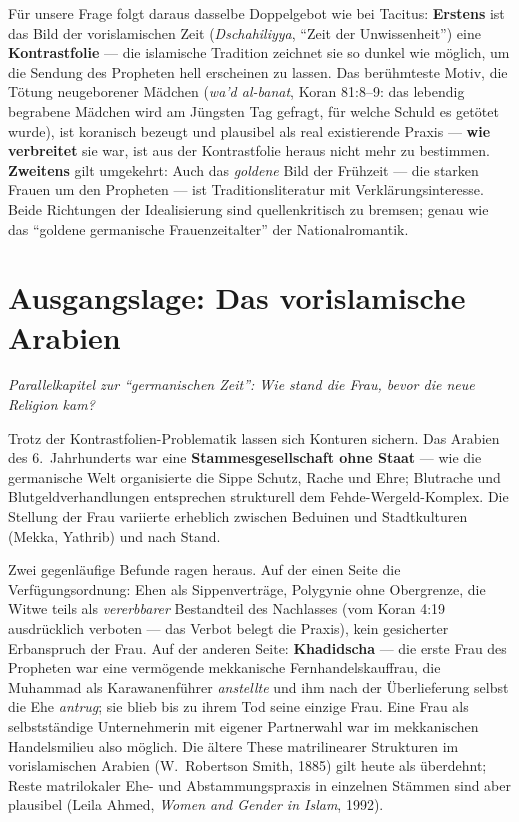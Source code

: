 \documentclass[11pt,a4paper,ngerman]{scrartcl}
\newcommand{\chipbase}[2]{\hspace{0pt}{\footnotesize\textcolor{#1}{[\textsc{#2}]}}}
\newcommand{\chipbelegt}[1]{\chipbase{chipgreen}{#1}}
\newcommand{\chipplausibel}[1]{\chipbase{chipamber}{#1}}
\newcommand{\chipumstritten}[1]{\chipbase{chipred}{#1}}
\begin{document}
Für unsere Frage folgt daraus dasselbe Doppelgebot wie bei Tacitus: \textbf{Erstens} ist das Bild der vorislamischen Zeit (\emph{Dschahiliyya}, \enquote{Zeit der Unwissenheit}) eine \textbf{Kontrastfolie} --- die islamische Tradition zeichnet sie so dunkel wie möglich, um die Sendung des Propheten hell erscheinen zu lassen. Das berühmteste Motiv, die Tötung neugeborener Mädchen (\emph{wa'd al-banat}, Koran 81:8--9: das lebendig begrabene Mädchen wird am Jüngsten Tag gefragt, für welche Schuld es getötet wurde), ist koranisch bezeugt und plausibel als real existierende Praxis --- \textbf{wie verbreitet} sie war, ist aus der Kontrastfolie heraus nicht mehr zu bestimmen. \chipplausibel{plausibel} \textbf{Zweitens} gilt umgekehrt: Auch das \emph{goldene} Bild der Frühzeit --- die starken Frauen um den Propheten --- ist Traditionsliteratur mit Verklärungsinteresse. Beide Richtungen der Idealisierung sind quellenkritisch zu bremsen; genau wie das \enquote{goldene germanische Frauenzeitalter} der Nationalromantik.

\section{Ausgangslage: Das vorislamische Arabien}
\noindent\textit{Parallelkapitel zur \enquote{germanischen Zeit}: Wie stand die Frau, bevor die neue Religion kam?}
\medskip

Trotz der Kontrastfolien-Problematik lassen sich Konturen sichern. Das Arabien des 6.~Jahrhunderts war eine \textbf{Stammesgesellschaft ohne Staat} --- wie die germanische Welt organisierte die Sippe Schutz, Rache und Ehre; Blutrache und Blutgeldverhandlungen entsprechen strukturell dem Fehde-Wergeld-Komplex. Die Stellung der Frau variierte erheblich zwischen Beduinen und Stadtkulturen (Mekka, Yathrib) und nach Stand. \chipbelegt{belegt}

Zwei gegenläufige Befunde ragen heraus. Auf der einen Seite die Verfügungsordnung: Ehen als Sippenverträge, Polygynie ohne Obergrenze, die Witwe teils als \emph{vererbbarer} Bestandteil des Nachlasses (vom Koran 4:19 ausdrücklich verboten --- das Verbot belegt die Praxis), kein gesicherter Erbanspruch der Frau. Auf der anderen Seite: \textbf{Khadidscha} --- die erste Frau des Propheten war eine vermögende mekkanische Fernhandelskauffrau, die Muhammad als Karawanenführer \emph{anstellte} und ihm nach der Überlieferung selbst die Ehe \emph{antrug}; sie blieb bis zu ihrem Tod seine einzige Frau. Eine Frau als selbstständige Unternehmerin mit eigener Partnerwahl war im mekkanischen Handelsmilieu also möglich. \chipbelegt{belegt} Die ältere These matrilinearer Strukturen im vorislamischen Arabien (W.~Robertson Smith, 1885) gilt heute als überdehnt; Reste matrilokaler Ehe- und Abstammungspraxis in einzelnen Stämmen sind aber plausibel (Leila Ahmed, \emph{Women and Gender in Islam}, 1992). \chipumstritten{umstritten}
\end{document}
